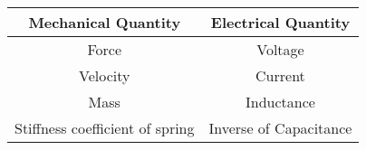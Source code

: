 \begin{tabular}{|c|c|} 
    \hline
\textbf{Mechanical Quantity} & \textbf{Electrical Quantity}  \\\hline
    Force & Voltage  \\\hline
    Velocity & Current  \\\hline
    Mass & Inductance  \\\hline
    Stiffness coefficient of spring& Inverse of Capacitance  \\\hline
    \end{tabular}
    
